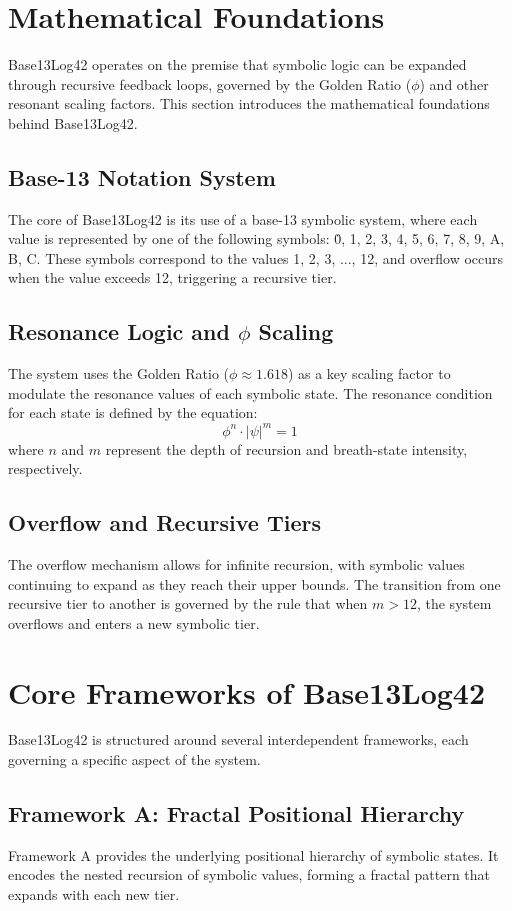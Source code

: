 \documentclass[12pt]{article}
\begin{document}
\section{Mathematical Foundations}
Base13Log42 operates on the premise that symbolic logic can be expanded through recursive feedback loops, governed by the Golden Ratio ($\phi$) and other resonant scaling factors. This section introduces the mathematical foundations behind Base13Log42.

\subsection{Base-13 Notation System}
The core of Base13Log42 is its use of a base-13 symbolic system, where each value is represented by one of the following symbols: {0̇, 1, 2, 3, 4, 5, 6, 7, 8, 9, A, B, C}. These symbols correspond to the values {1, 2, 3, ..., 12}, and overflow occurs when the value exceeds 12, triggering a recursive tier.

\subsection{Resonance Logic and $\phi$ Scaling}
The system uses the Golden Ratio ($\phi \approx 1.618$) as a key scaling factor to modulate the resonance values of each symbolic state. The resonance condition for each state is defined by the equation:
\[
\phi^n \cdot |\psi|^m = 1
\]
where $n$ and $m$ represent the depth of recursion and breath-state intensity, respectively.

\subsection{Overflow and Recursive Tiers}
The overflow mechanism allows for infinite recursion, with symbolic values continuing to expand as they reach their upper bounds. The transition from one recursive tier to another is governed by the rule that when $m > 12$, the system overflows and enters a new symbolic tier.

\section{Core Frameworks of Base13Log42}
Base13Log42 is structured around several interdependent frameworks, each governing a specific aspect of the system.

\subsection{Framework A: Fractal Positional Hierarchy}
Framework A provides the underlying positional hierarchy of symbolic states. It encodes the nested recursion of symbolic values, forming a fractal pattern that expands with each new tier.
\end{document}
